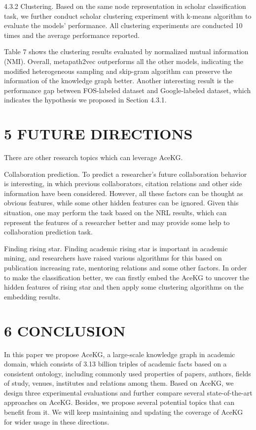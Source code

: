 \documentclass[10pt]{article}
\begin{document}
4.3.2 Clustering. Based on the same node representation in scholar classification task, we further conduct scholar clustering experiment with $\mathrm{k}$-means algorithm to evaluate the models' performance. All clustering experiments are conducted 10 times and the average performance reported.

Table 7 shows the clustering results evaluated by normalized mutual information (NMI). Overall, metapath2vec outperforms all the other models, indicating the modified heterogeneous sampling and skip-gram algorithm can preserve the information of the knowledge graph better. Another interesting result is the performance gap between FOS-labeled dataset and Google-labeled dataset, which indicates the hypothesis we proposed in Section 4.3.1.

\section*{5 FUTURE DIRECTIONS}
There are other research topics which can leverage AceKG.

Collaboration prediction. To predict a researcher's future collaboration behavior is interesting, in which previous collaborators, citation relations and other side information have been considered. However, all these factors can be thought as obvious features, while some other hidden features can be ignored. Given this situation, one may perform the task based on the NRL results, which can represent the features of a researcher better and may provide some help to collaboration prediction task.

Finding rising star. Finding academic rising star is important in academic mining, and researchers have raised various algorithms for this based on publication increasing rate, mentoring relations and some other factors. In order to make the classification better, we can firstly embed the AceKG to uncover the hidden features of rising star and then apply some clustering algorithms on the embedding results.

\section*{6 CONCLUSION}
In this paper we propose AceKG, a large-scale knowledge graph in academic domain, which consists of 3.13 billion triples of academic facts based on a consistent ontology, including commonly used properties of papers, authors, fields of study, venues, institutes and relations among them. Based on AceKG, we design three experimental evaluations and further compare several state-of-the-art approaches on AceKG. Besides, we propose several potential topics that can benefit from it. We will keep maintaining and updating the coverage of AceKG for wider usage in these directions.
\end{document}
